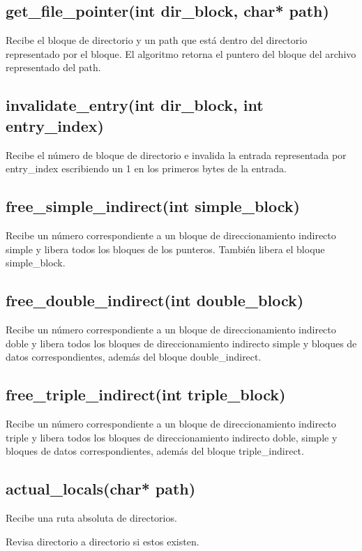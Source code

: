 \documentclass[12pt]{article}
\begin{document}
\subsection{get\_file\_pointer(int dir\_block, char* path)}
Recibe el bloque de directorio y un path que está dentro del directorio representado por el bloque. El algoritmo retorna el puntero del bloque del archivo representado del path.

\subsection{invalidate\_entry(int dir\_block, int entry\_index)}
Recibe el número de bloque de directorio e invalida la entrada representada por entry\_index escribiendo un 1 en los primeros bytes de la entrada.

\subsection{free\_simple\_indirect(int simple\_block)}
Recibe un número correspondiente a un bloque de direccionamiento indirecto simple y libera todos los bloques de los punteros. También libera el bloque simple\_block.

\subsection{free\_double\_indirect(int double\_block)}
Recibe un número correspondiente a un bloque de direccionamiento indirecto doble y libera todos los bloques de direccionamiento indirecto simple y bloques de datos correspondientes, además del bloque double\_indirect.

\subsection{free\_triple\_indirect(int triple\_block)}
Recibe un número correspondiente a un bloque de direccionamiento indirecto triple y libera todos los bloques de direccionamiento indirecto doble, simple y bloques de datos correspondientes, además del bloque triple\_indirect.

\subsection{actual\_locals(char* path)}
Recibe una ruta absoluta de directorios.

Revisa directorio a directorio si estos existen.
\end{document}
